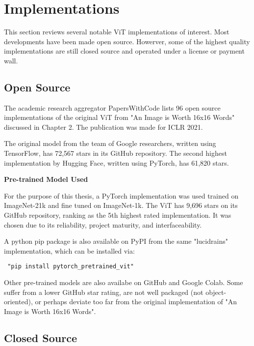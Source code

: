 \section{Implementations}

This section reviews several notable ViT implementations of interest.
Most developments have been made open source. Howerver, some of the 
highest quality implementations are still closed source and operated 
under a license or payment wall.

\subsection{Open Source}

The academic research aggregator PapersWithCode lists 96 open source implementations of 
the original ViT from "An Image is Worth 16x16 Words" discussed in Chapter 2. 
The publication was made for ICLR 2021. \citep{Papers16}

The original model from the team of Google researchers, written using TensorFlow, has 72,567 stars in its GitHub repository.
The second highest implementation by Hugging Face, written using PyTorch, has 61,820 stars. 


\vspace{5mm}

\textbf{Pre-trained Model Used}

For the purpose of this thesis, a PyTorch implementation was used trained on ImageNet-21k
and fine tuned on ImageNet-1k. The ViT has 9,696 stars on its GitHub repository,
ranking as the 5th highest rated implementation. It was chosen due to its reliability,
project maturity, and interfaceability. \citep{Papers16}

\vspace{5mm}

A python pip package is also available on PyPI from the same "lucidrains" implementation,
which can be installed via: 
\begin{verbatim} "pip install pytorch_pretrained_vit" \end{verbatim}


Other pre-trained models are also availabe on GitHub and Google Colab. 
Some suffer from a lower GitHub star rating, are not well packaged (not object-oriented), or perhaps deviate too far
from the original implementation of "An Image is Worth 16x16 Words". 


\subsection{Closed Source}


